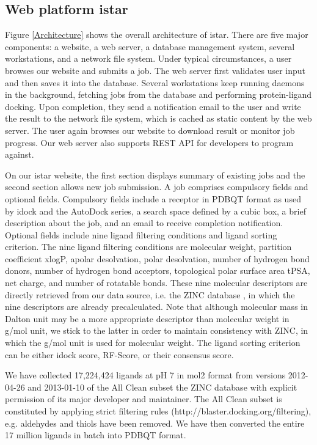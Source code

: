 \documentclass[10pt]{article}
\begin{document}
\subsection*{Web platform istar}
Figure \ref{Architecture} shows the overall architecture of istar. There are five major components: a website, a web server, a database management system, several workstations, and a network file system. Under typical circumstances, a user browses our website and submits a job. The web server first validates user input and then saves it into the database. Several workstations keep running daemons in the background, fetching jobs from the database and performing protein-ligand docking. Upon completion, they send a notification email to the user and write the result to the network file system, which is cached as static content by the web server. The user again browses our website to download result or monitor job progress. Our web server also supports REST API for developers to program against.

On our istar website, the first section displays summary of existing jobs and the second section allows new job submission. A job comprises compulsory fields and optional fields. Compulsory fields include a receptor in PDBQT format as used by idock and the AutoDock series, a search space defined by a cubic box, a brief description about the job, and an email to receive completion notification. Optional fields include nine ligand filtering conditions and ligand sorting criterion. The nine ligand filtering conditions are molecular weight, partition coefficient xlogP, apolar desolvation, polar desolvation, number of hydrogen bond donors, number of hydrogen bond acceptors, topological polar surface area tPSA, net charge, and number of rotatable bonds. These nine molecular descriptors are directly retrieved from our data source, i.e. the ZINC database \cite{532,1178}, in which the nine descriptors are already precalculated. Note that although molecular mass in Dalton unit may be a more appropriate descriptor than molecular weight in g/mol unit, we stick to the latter in order to maintain consistency with ZINC, in which the g/mol unit is used for molecular weight. The ligand sorting criterion can be either idock score, RF-Score, or their consensus score.

We have collected 17,224,424 ligands at pH 7 in mol2 format from versions 2012-04-26 and 2013-01-10 of the All Clean subset the ZINC database \cite{532,1178} with explicit permission of its major developer and maintainer. The All Clean subset is constituted by applying strict filtering rules (http://blaster.docking.org/filtering), e.g. aldehydes and thiols have been removed. We have then converted the entire 17 million ligands in batch into PDBQT format.
\end{document}
